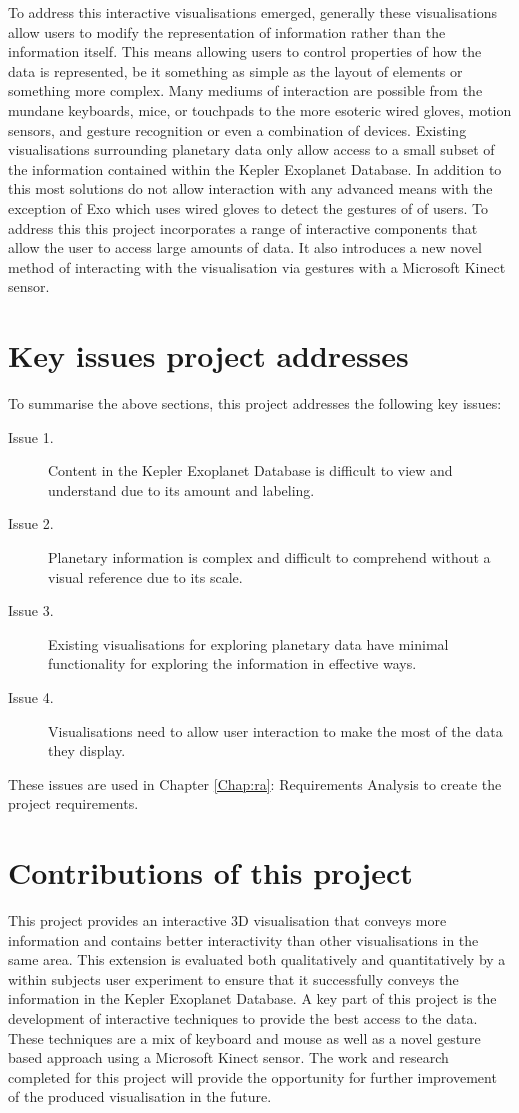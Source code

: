 To address
this interactive visualisations emerged, generally these visualisations allow
users to modify the representation of information rather than the information
itself. This means allowing users to control properties of how the data is
represented, be it something as simple as the layout of elements or something
more complex. Many mediums of interaction are possible from the mundane
keyboards, mice, or touchpads to the more esoteric wired gloves, motion sensors,
and gesture recognition or even a combination of devices. Existing
visualisations surrounding planetary data only allow access to a small subset of
the information contained within the Kepler Exoplanet Database. In addition to
this most solutions do not allow interaction with any advanced means with the
exception of Exo \cite{exo} which uses wired gloves to detect the gestures of of
users. To address this this project incorporates a range of interactive
components that allow the user to access large amounts of data. It also
introduces a new novel method of interacting with the visualisation via gestures
with a Microsoft Kinect sensor.

\section{Key issues project addresses}
To summarise the above sections, this project addresses the following key
issues:
\begin{description}
 \item[Issue 1.] Content in the Kepler Exoplanet Database is difficult to view
and
understand due to its amount and labeling.
 \item[Issue 2.] Planetary information is complex and difficult to comprehend
without
a visual reference due to its scale.
 \item[Issue 3.] Existing visualisations for exploring planetary data have
minimal
functionality for exploring the information in effective ways.
 \item[Issue 4.] Visualisations need to allow user interaction to make the most
of
the data they display.
\end{description}
These issues are used in Chapter \ref{Chap:ra}: Requirements Analysis to create
the project requirements.

\section{Contributions of this project}
This project provides an interactive 3D visualisation that conveys more information and
contains better interactivity than other visualisations in the same area. This
extension is evaluated both qualitatively and quantitatively by a within subjects user experiment to ensure that it
successfully conveys the information in the Kepler Exoplanet Database.
A key part of this project is the development of interactive techniques to provide the best access to the data. These techniques are a mix of keyboard and
mouse as well as a novel gesture based approach using a Microsoft Kinect sensor.
The work and research completed for this project will provide the opportunity
for further improvement of the produced visualisation in the future.
